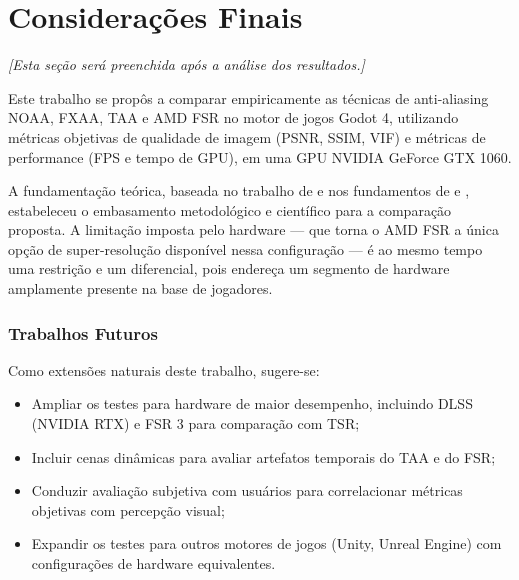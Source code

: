 \documentclass[twoside,english,brazilian]{UNISINOSmonografia}
\begin{document}
\chapter{Considerações Finais}

\textit{[Esta seção será preenchida após a análise dos resultados.]}

Este trabalho se propôs a comparar empiricamente as técnicas de anti-aliasing NOAA, FXAA, TAA e AMD FSR no motor de jogos Godot 4, utilizando métricas objetivas de qualidade de imagem (PSNR, SSIM, VIF) e métricas de performance (FPS e tempo de GPU), em uma GPU NVIDIA GeForce GTX 1060.

A fundamentação teórica, baseada no trabalho de  e nos fundamentos de  e , estabeleceu o embasamento metodológico e científico para a comparação proposta. A limitação imposta pelo hardware — que torna o AMD FSR a única opção de super-resolução disponível nessa configuração — é ao mesmo tempo uma restrição e um diferencial, pois endereça um segmento de hardware amplamente presente na base de jogadores.

\subsection*{Trabalhos Futuros}

Como extensões naturais deste trabalho, sugere-se:

\begin{itemize}
    \item Ampliar os testes para hardware de maior desempenho, incluindo DLSS (NVIDIA RTX) e FSR 3 para comparação com TSR;
    \item Incluir cenas dinâmicas para avaliar artefatos temporais do TAA e do FSR;
    \item Conduzir avaliação subjetiva com usuários para correlacionar métricas objetivas com percepção visual;
    \item Expandir os testes para outros motores de jogos (Unity, Unreal Engine) com configurações de hardware equivalentes.
\end{itemize}


\end{document}
